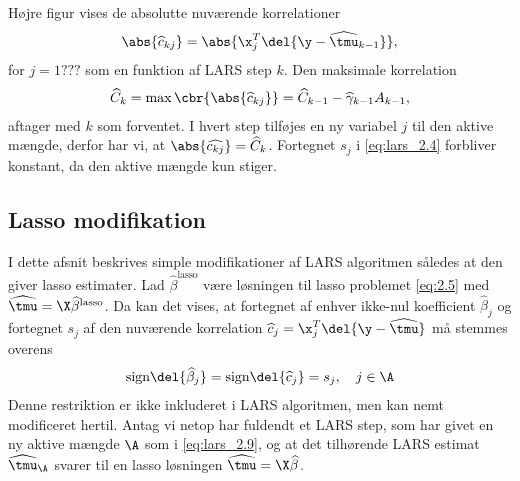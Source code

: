 Højre figur vises de absolutte nuværende korrelationer
\begin{align*}
\abs{\widehat{c}_{kj}} = \abs{\x_j^T \del{\y - \widehat{\tmu}_{k-1}}},
\end{align*}
for \(j = 1???\) som en funktion af LARS step \(k\).
Den maksimale korrelation
\begin{align*}
\widehat{C}_k = \max \cbr{\abs{\widehat{c}_{kj}}} = \widehat{C}_{k-1} - \widehat{\gamma}_{k-1} A_{k-1},
\end{align*}
aftager med \(k\) som forventet.
I hvert step tilføjes en ny variabel \(j\) til den aktive mængde, derfor har vi, at \(\abs{\widehat{c_{kj}}} = \widehat{C}_k\).
Fortegnet \(s_j\) i \eqref{eq:lars_2.4} forbliver konstant, da den aktive mængde kun stiger.

\subsection{Lasso modifikation}
I dette afsnit beskrives simple modifikationer af LARS algoritmen således at den giver lasso estimater.
Lad \(\widehat{\beta}^\text{lasso}\) være løsningen til lasso problemet \eqref{eq:2.5} med \(\widehat{\tmu} = \X \widehat{\beta}^\text{lasso}\).
Da kan det vises, at fortegnet af enhver ikke-nul koefficient \(\widehat{\beta}_j\) og fortegnet \(s_j\) af den nuværende korrelation \(\widehat{c}_j = \x_j^T \del{\y - \widehat{\tmu}}\) må stemmes overens
\begin{align}
\text{sign} \del{\widehat{\beta}_j } = \text{sign} \del{\widehat{c}_j } = s_j, \quad j \in \A \label{eq:lars_3.1}
\end{align}
%
%
Denne restriktion er ikke inkluderet i LARS algoritmen, men kan nemt modificeret hertil. 
Antag vi netop har fuldendt et LARS step, som har givet en ny aktive mængde \(\A\) som i \eqref{eq:lars_2.9}, og at det tilhørende LARS estimat \(\widehat{\tmu}_\A\) svarer til en lasso løsningen \(\widehat{\tmu} = \X \widehat{\beta}\).
